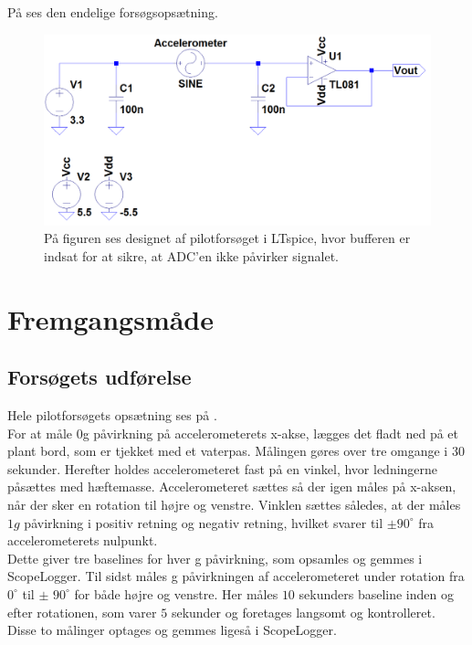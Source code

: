 \noindent På  ses den endelige forsøgsopsætning.
\begin{figure}[H]
	\centering
	\includegraphics[scale=0.4]{figures/Bilag/Acc_medbuffer.png}
	\caption{På figuren ses designet af pilotforsøget i LTspice, hvor bufferen er indsat for at sikre, at ADC'en ikke påvirker signalet.}
	\label{pforsoeg1}
\end{figure}

\section{Fremgangsmåde}
\subsection{Forsøgets udførelse}
Hele pilotforsøgets opsætning ses på . \\
For at måle $0$g påvirkning på accelerometerets x-akse, lægges det fladt ned på et plant bord, som er tjekket med et vaterpas. Målingen gøres over tre omgange i $30$ sekunder. Herefter holdes accelerometeret fast på en vinkel, hvor ledningerne påsættes med hæftemasse. Accelerometeret sættes så der igen måles på x-aksen, når der sker en rotation til højre og venstre. Vinklen sættes således, at der måles $1g$ påvirkning i positiv retning og negativ retning, hvilket svarer til $\pm90^{\circ}$ fra accelerometerets nulpunkt. \\
Dette giver tre baselines for hver g påvirkning, som opsamles og gemmes i ScopeLogger. %
Til sidst måles g påvirkningen af accelerometeret under rotation fra $0^{\circ}$ til $\pm$ $90^{\circ}$ for både højre og venstre. Her måles $10$ sekunders baseline inden og efter rotationen, som varer $5$ sekunder og foretages langsomt og kontrolleret. Disse to målinger optages og gemmes ligeså i ScopeLogger. \\

